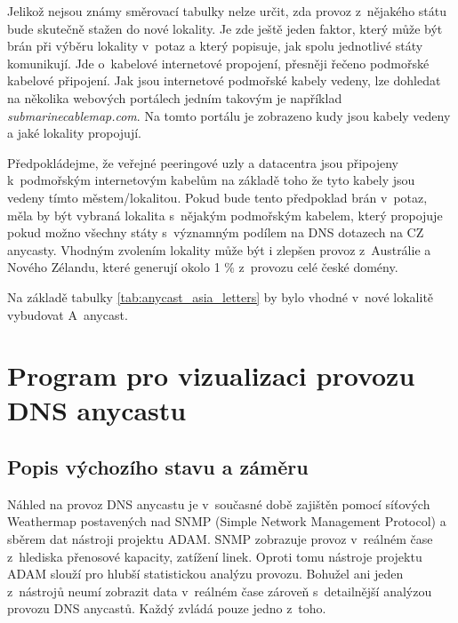 \documentclass[thesis=M,czech]{src/FITthesis}[2019/12/23]
\begin{document}
Jelikož nejsou známy směrovací tabulky nelze určit, zda provoz z~nějakého státu bude skutečně stažen do nové lokality. Je zde ještě jeden faktor, který může být brán při výběru lokality v~potaz a který popisuje, jak spolu jednotlivé státy komunikují. Jde o~kabelové internetové propojení, přesněji řečeno podmořské kabelové připojení. Jak jsou internetové podmořské kabely vedeny, lze dohledat na několika webových portálech jedním takovým je například \textit{submarinecablemap.com}. Na tomto portálu je zobrazeno kudy jsou kabely vedeny a jaké lokality propojují. 

Předpokládejme, že veřejné peeringové uzly a datacentra jsou připojeny k~podmořským internetovým kabelům na základě toho že tyto kabely jsou vedeny tímto městem/lokalitou. Pokud bude tento předpoklad brán v~potaz, měla by být vybraná lokalita s~nějakým podmořským kabelem, který propojuje pokud možno všechny státy s~významným podílem na DNS dotazech na CZ anycasty. Vhodným zvolením lokality může být i zlepšen provoz z~Austrálie a Nového Zélandu, které generují okolo 1 \% z~provozu celé české domény. 

Na základě tabulky \ref{tab:anycast_asia_letters} by bylo vhodné v~nové lokalitě vybudovat A~anycast. 






















\chapter{Program pro vizualizaci provozu DNS anycastu}
\section{Popis výchozího stavu a záměru}
Náhled na provoz DNS anycastu je v~současné době zajištěn pomocí síťových Weathermap postavených nad SNMP (Simple Network Management Protocol) a sběrem dat nástroji projektu ADAM. SNMP zobrazuje provoz v~reálném čase z~hlediska přenosové kapacity, zatížení linek. Oproti tomu nástroje projektu ADAM slouží pro hlubší statistickou analýzu provozu. Bohužel ani jeden z~nástrojů neumí zobrazit data v~reálném čase zároveň s~detailnější analýzou provozu DNS anycastů. Každý zvládá pouze jedno z~toho.
\end{document}
